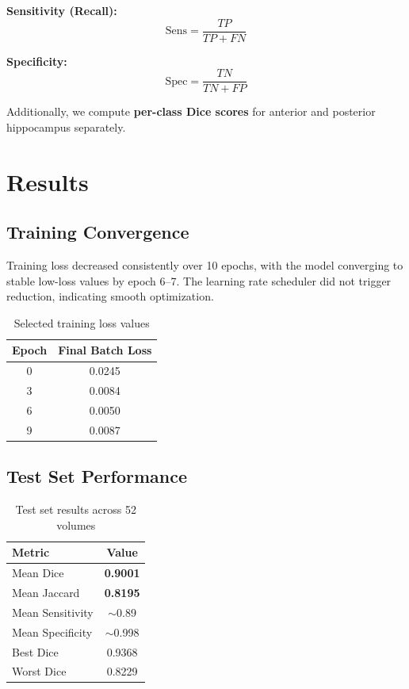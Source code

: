 \documentclass[12pt,a4paper,twocolumn]{article}
\begin{document}
\textbf{Sensitivity (Recall):}
\begin{equation}
\text{Sens} = \frac{TP}{TP + FN}
\end{equation}

\textbf{Specificity:}
\begin{equation}
\text{Spec} = \frac{TN}{TN + FP}
\end{equation}

Additionally, we compute \textbf{per-class Dice scores} for anterior and posterior hippocampus separately.

\section{Results}

\subsection{Training Convergence}

Training loss decreased consistently over 10 epochs, with the model converging to stable low-loss values by epoch 6--7. The learning rate scheduler did not trigger reduction, indicating smooth optimization.

\begin{table}[H]
\centering
\small
\begin{tabular}{cc}
\toprule
\textbf{Epoch} & \textbf{Final Batch Loss} \\
\midrule
0 & 0.0245 \\
3 & 0.0084 \\
6 & 0.0050 \\
9 & 0.0087 \\
\bottomrule
\end{tabular}
\caption{Selected training loss values}
\end{table}

\subsection{Test Set Performance}

\begin{table}[H]
\centering
\small
\begin{tabular}{lc}
\toprule
\textbf{Metric} & \textbf{Value} \\
\midrule
Mean Dice & \textbf{0.9001} \\
Mean Jaccard & \textbf{0.8195} \\
Mean Sensitivity & $\sim$0.89 \\
Mean Specificity & $\sim$0.998 \\
Best Dice & 0.9368 \\
Worst Dice & 0.8229 \\
\bottomrule
\end{tabular}
\caption{Test set results across 52 volumes}
\label{tab:results}
\end{table}
\end{document}
